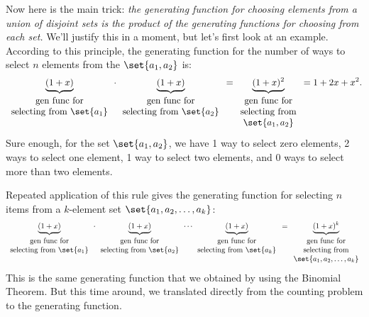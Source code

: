 Now here is the main trick: \emph{the generating function for
choosing elements from a union of disjoint sets is the product of the
generating functions for choosing from each set.}  We'll justify this
in a moment, but let's first look at an example.  According to this
principle, the generating function for the number of ways to select
$n$ elements from the $\set{a_1, a_2}$ is:
%
\[
\underbrace{(1 + x)}_{
\begin{array}{cc}
\text{gen func for} \\
\text{selecting from $\set{a_1}$}
\end{array}}
\cdot
\underbrace{(1 + x)}_{
\begin{array}{cc}
\text{gen func for} \\
\text{selecting from $\set{a_2}$}
\end{array}}
=
\underbrace{(1 + x)^2}_{
\begin{array}{cc}
\text{gen func for} \\
\text{selecting from} \\
\set{a_1, a_2}
\end{array}}
= 1 + 2x + x^2.
\]
%
Sure enough, for the set $\set{a_1, a_2}$, we have 1 way to select
zero elements, 2 ways to select one element, 1 way to select two
elements, and 0 ways to select more than two elements.

Repeated application of this rule gives the generating function for
selecting $n$ items from a $k$-element set $\set{a_1, a_2, \dots,
a_k}$:
%
\[
\underbrace{(1 + x)}_{
\begin{array}{cc}
\mbox{gen func for} \\
\text{selecting from $\set{a_1}$}
\end{array}}
\cdot
\underbrace{(1 + x)}_{
\begin{array}{cc}
\mbox{gen func for} \\
\text{selecting from $\set{a_2}$}
\end{array}}
\cdots
\underbrace{(1 + x)}_{
\begin{array}{cc}
\mbox{gen func for} \\
\text{selecting from $\set{a_k}$}
\end{array}}
=
\underbrace{(1 + x)^k}_{
\begin{array}{cc}
\mbox{gen func for} \\
\text{selecting from} \\
\set{a_1, a_2, \dots, a_k}
\end{array}}
\]
%
This is the same generating function that we obtained by using the
Binomial Theorem.  But this time around, we translated directly from
the counting problem to the generating function.

